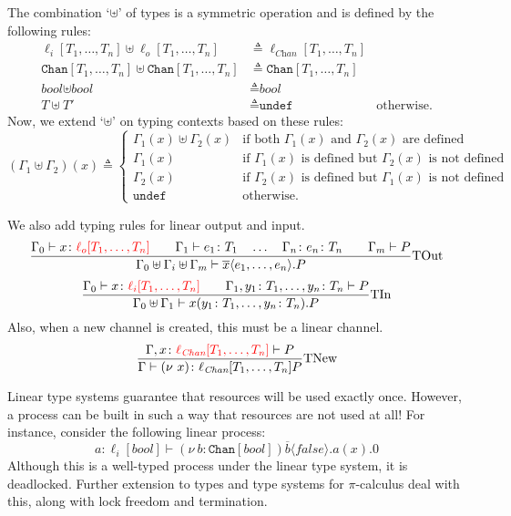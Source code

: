 \documentclass[a4paper, openany]{memoir}
\theoremstyle{definition}
\begin{document}
    The combination `$\uplus$' of types is a symmetric operation and is defined by the following rules:
    \begin{align*}
        \ell_i[T_1, \dots, T_n] \uplus \ell_o[T_1, \dots, T_n] &\triangleq \ell_{\textit{Chan}}[T_1, \dots, T_n] \\
        \texttt{Chan}[T_1, \dots, T_n] \uplus \texttt{Chan}[T_1, \dots, T_n] &\triangleq \texttt{Chan}[T_1, \dots, T_n] \\
        \textit{bool} \uplus \textit{bool} &\triangleq \textit{bool} \\
        T \uplus T' &\triangleq \texttt{undef} & \textrm{otherwise}.
    \end{align*}
    Now, we extend `$\uplus$' on typing contexts based on these rules:
    \[(\Gamma_1 \uplus \Gamma_2)(x) \triangleq \begin{cases}
        \Gamma_1(x) \uplus \Gamma_2(x) & \textrm{if both } \Gamma_1(x) \textrm{ and } \Gamma_2(x) \textrm{ are defined} \\
        \Gamma_1(x) & \textrm{if } \Gamma_1(x) \textrm{ is defined but } \Gamma_2(x) \textrm{ is not defined} \\
        \Gamma_2(x) & \textrm{if } \Gamma_2(x) \textrm{ is defined but } \Gamma_1(x) \textrm{ is not defined} \\
        \texttt{undef} & \textrm{otherwise}.
    \end{cases}\]
    
    We also add typing rules for linear output and input.
    \[\frac{\Gamma_0 \vdash x \colon {\color{red}\ell_o[T_1, \dots, T_n]} \qquad \Gamma_1 \vdash e_1 \colon T_1 \quad \dots \quad \Gamma_n \colon  e_n \colon T_n \qquad \Gamma_m \vdash P}{\Gamma_0 \uplus \Gamma_i \uplus \Gamma_m \vdash \overline{x} \langle e_1, \dots, e_n \rangle.P} \textrm{TOut}\]
    \[\frac{\Gamma_0 \vdash x \colon {\color{red}\ell_i[T_1, \dots, T_n]} \qquad \Gamma_1, y_1 \colon T_1, \dots, y_n \colon T_n \vdash P}{\Gamma_0 \uplus \Gamma_1 \vdash x(y_1 \colon T_1, \dots, y_n \colon T_n).P} \textrm{TIn}\]
    Also, when a new channel is created, this must be a linear channel.
    \[\frac{\Gamma, x \colon {\color{red} \ell_{\textit{Chan}}[T_1, \dots, T_n]} \vdash P}{\Gamma \vdash (\nu \ x) \colon \ell_{\textit{Chan}}[T_1, \dots, T_n] P} \textrm{TNew}\]

    Linear type systems guarantee that resources will be used exactly once. However, a process can be built in such a way that resources are not used at all! For instance, consider the following linear process:
    \[a \colon \ell_i[\textit{bool}] \vdash (\nu \ b\colon \texttt{Chan}[\textit{bool}] )\overline{b} \langle \textit{false} \rangle.a(x).0\]
    Although this is a well-typed process under the linear type system, it is deadlocked. Further extension to types and type systems for $\pi$-calculus deal with this, along with lock freedom and termination.
    \newpage
\end{document}

